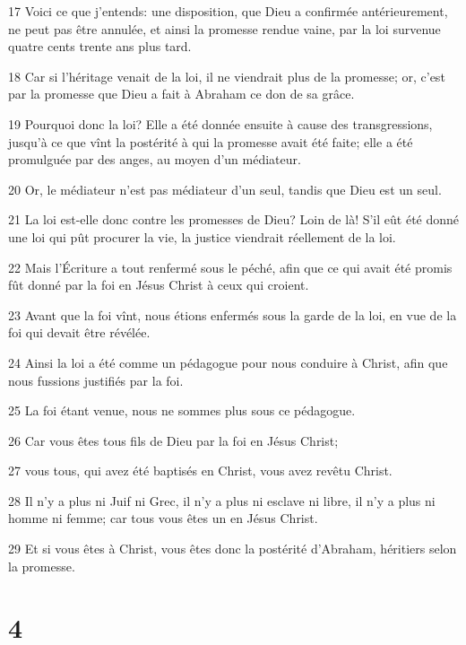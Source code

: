 \par 17 Voici ce que j'entends: une disposition, que Dieu a confirmée antérieurement, ne peut pas être annulée, et ainsi la promesse rendue vaine, par la loi survenue quatre cents trente ans plus tard.
\par 18 Car si l'héritage venait de la loi, il ne viendrait plus de la promesse; or, c'est par la promesse que Dieu a fait à Abraham ce don de sa grâce.
\par 19 Pourquoi donc la loi? Elle a été donnée ensuite à cause des transgressions, jusqu'à ce que vînt la postérité à qui la promesse avait été faite; elle a été promulguée par des anges, au moyen d'un médiateur.
\par 20 Or, le médiateur n'est pas médiateur d'un seul, tandis que Dieu est un seul.
\par 21 La loi est-elle donc contre les promesses de Dieu? Loin de là! S'il eût été donné une loi qui pût procurer la vie, la justice viendrait réellement de la loi.
\par 22 Mais l'Écriture a tout renfermé sous le péché, afin que ce qui avait été promis fût donné par la foi en Jésus Christ à ceux qui croient.
\par 23 Avant que la foi vînt, nous étions enfermés sous la garde de la loi, en vue de la foi qui devait être révélée.
\par 24 Ainsi la loi a été comme un pédagogue pour nous conduire à Christ, afin que nous fussions justifiés par la foi.
\par 25 La foi étant venue, nous ne sommes plus sous ce pédagogue.
\par 26 Car vous êtes tous fils de Dieu par la foi en Jésus Christ;
\par 27 vous tous, qui avez été baptisés en Christ, vous avez revêtu Christ.
\par 28 Il n'y a plus ni Juif ni Grec, il n'y a plus ni esclave ni libre, il n'y a plus ni homme ni femme; car tous vous êtes un en Jésus Christ.
\par 29 Et si vous êtes à Christ, vous êtes donc la postérité d'Abraham, héritiers selon la promesse.

\chapter{4}

